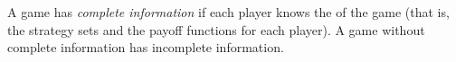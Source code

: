 \documentclass[12pt]{article}
\begin{document}
A game has \emph{complete information} if each player knows the  of the game (that is, the strategy sets and the payoff functions for each player).  A game without complete information has incomplete information.
\end{document}
